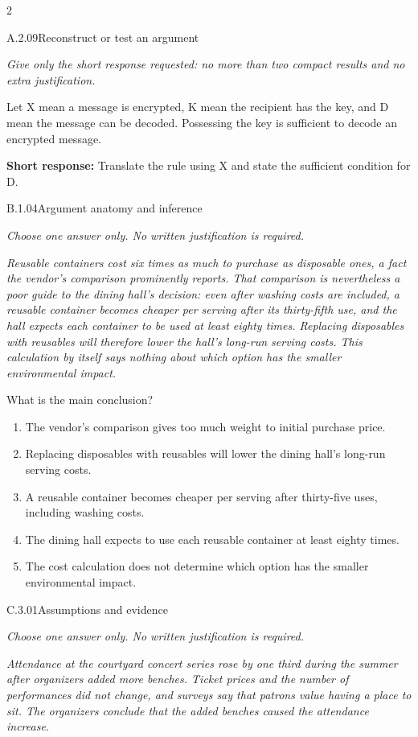 \documentclass[9pt]{extarticle}
\newcommand{\choice}[1]{\item #1}
\begin{document}
\CoreWorkArea
\FormBreak
{}
\begin{multicols}{2}
\begin{DenseCoreProblem}{A.2.09}{Reconstruct or test an argument}
{\scriptsize\textit{Give only the short response requested: no more than two compact results and no extra justification.}\par}
Let X mean a message is encrypted, K mean the recipient has the key, and D mean the message can be decoded. Possessing the key is sufficient to decode an encrypted message.

\textbf{Short response:} Translate the rule using X and state the sufficient condition for D.
\end{DenseCoreProblem}
\begin{DenseCoreProblem}{B.1.04}{Argument anatomy and inference}
{\scriptsize\textit{Choose one answer only. No written justification is required.}\par}
\emph{Reusable containers cost six times as much to purchase as disposable ones, a fact the vendor's comparison prominently reports. That comparison is nevertheless a poor guide to the dining hall's decision: even after washing costs are included, a reusable container becomes cheaper per serving after its thirty-fifth use, and the hall expects each container to be used at least eighty times. Replacing disposables with reusables will therefore lower the hall's long-run serving costs. This calculation by itself says nothing about which option has the smaller environmental impact.}

What is the main conclusion?
\begin{enumerate}[label=(\alph*)]
  \choice{The vendor's comparison gives too much weight to initial purchase price.}
  \choice{Replacing disposables with reusables will lower the dining hall's long-run serving costs.}
  \choice{A reusable container becomes cheaper per serving after thirty-five uses, including washing costs.}
  \choice{The dining hall expects to use each reusable container at least eighty times.}
  \choice{The cost calculation does not determine which option has the smaller environmental impact.}
\end{enumerate}
\end{DenseCoreProblem}
\columnbreak
\begin{DenseCoreProblem}{C.3.01}{Assumptions and evidence}
{\scriptsize\textit{Choose one answer only. No written justification is required.}\par}
\emph{Attendance at the courtyard concert series rose by one third during the summer after organizers added more benches. Ticket prices and the number of performances did not change, and surveys say that patrons value having a place to sit. The organizers conclude that the added benches caused the attendance increase.}


\end{DenseCoreProblem}
\end{multicols}
\end{document}
